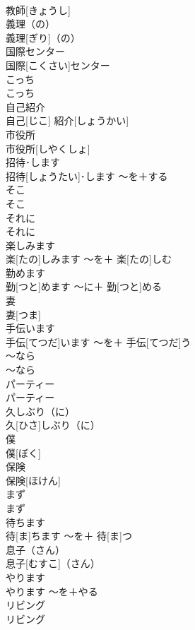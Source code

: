 \documentclass[8pt]{extreport}
\begin{document}
\begin{CJK}{UTF8}{min}
\\	教師[きょうし]		
\\	義理（の）	
\\	義理[ぎり]（の）		
\\	国際センター	
\\	国際[こくさい]センター		
\\	こっち	
\\	こっち		
\\	自己紹介	
\\	自己[じこ] 紹介[しょうかい]		
\\	市役所	
\\	市役所[しやくしょ]		
\\	招待･します	
\\	招待[しょうたい]･します	〜を＋する	
\\	そこ	
\\	そこ		
\\	それに	
\\	それに		
\\	楽しみます	
\\	楽[たの]しみます	〜を＋ 楽[たの]しむ	
\\	勤めます	
\\	勤[つと]めます	〜に＋ 勤[つと]める	
\\	妻	
\\	妻[つま]		
\\	手伝います	
\\	手伝[てつだ]います	〜を＋ 手伝[てつだ]う	
\\	〜なら	
\\	〜なら		
\\	パーティー	
\\	パーティー		
\\	久しぶり（に）	
\\	久[ひさ]しぶり（に）		
\\	僕	
\\	僕[ぼく]		
\\	保険	
\\	保険[ほけん]		
\\	まず	
\\	まず		
\\	待ちます	
\\	待[ま]ちます	〜を＋ 待[ま]つ	
\\	息子（さん）	
\\	息子[むすこ]（さん）		
\\	やります	
\\	やります	〜を＋やる	
\\	リビング	
\\	リビング		

\end{CJK}
\end{document}
